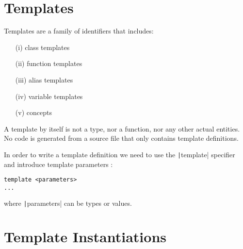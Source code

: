 \section*{Templates}

Templates are a family of identifiers that includes:
\begin{paracol}{2}
\begin{itemize}
    \item[(i)] class templates \vspace{10pt}
    \item[(ii)] function templates \vspace{10pt}
    \item[(iii)] alias templates \vspace{10pt}
        \switchcolumn
    \item[(iv)] variable templates \vspace{10pt}
    \item[(v)] concepts
\end{itemize}
\end{paracol}

A template by itself is not a type, nor a function, nor any other actual entities. No code is generated from a source file that only contains template definitions.


In order to write a template definition we need to use the \texttt|template| specifier and introduce template parameters :

\begin{paracol}{2}
\begin{verbatim}
template <parameters>
...
\end{verbatim}

\switchcolumn

\vspace{5pt}
where \texttt|parameters| can be types or values. 

\end{paracol}

\section*{Template Instantiations}

